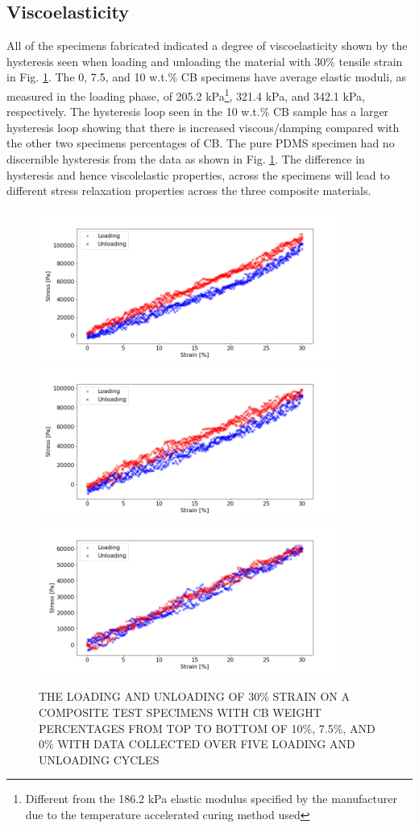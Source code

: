 \subsection*{Viscoelasticity}
All of the specimens fabricated indicated a degree of viscoelasticity shown by the hysteresis seen when loading and unloading the material with 30\% tensile strain in Fig. \ref{fig:loading-and-unloading-specimens}. The 0, 7.5, and 10 w.t.\% CB specimens have average elastic moduli, as measured in the loading phase, of 205.2 kPa\footnote{Different from the 186.2 kPa elastic modulus specified by the manufacturer due to the temperature accelerated curing method used}, 321.4 kPa, and 342.1 kPa, respectively. The hysteresis loop seen in the 10 w.t.\% CB sample has a larger hysteresis loop showing that there is increased viscous/damping compared with the other two specimens percentages of CB. The pure PDMS specimen had no discernible hysteresis from the data as shown in Fig. \ref{fig:loading-and-unloading-specimens}.  The difference in hysteresis and hence viscolelastic properties, across the specimens will lead to different stress relaxation properties across the three composite materials.
\begin{figure}[H]
    \centering
    \includegraphics[width=10cm]{Figures/load_unload_1_10_E4pin_20mm_v9_0.3Strain.png}
    \includegraphics[width=10cm]{Figures/load_unload_2_7-5_E4pin_20mm_v10_0.3Strain.png}
    \includegraphics[width=10cm]{Figures/load_unload_1_CB0_v1_0.3Strain.png}
    \caption{THE LOADING AND UNLOADING OF 30\% STRAIN ON A COMPOSITE TEST SPECIMENS WITH CB WEIGHT PERCENTAGES FROM TOP TO BOTTOM OF 10\%, 7.5\%, AND 0\% WITH DATA COLLECTED OVER FIVE LOADING AND UNLOADING CYCLES}
    \label{fig:loading-and-unloading-specimens}
\end{figure}


